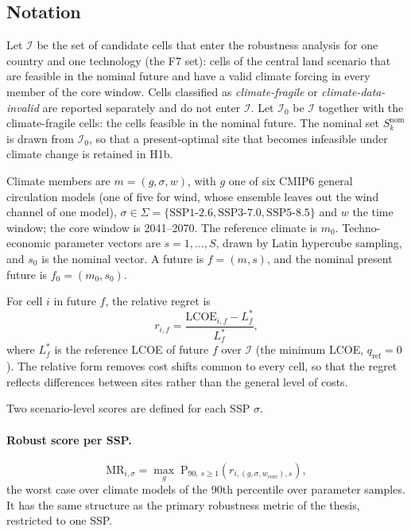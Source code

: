 \subsection{Notation}
\label{subsec:h1_notation}

Let $\mathcal{I}$ be the set of candidate cells that enter the robustness
analysis for one country and one technology (the F7 set): cells of the central
land scenario that are feasible in the nominal future and have a valid climate
forcing in every member of the core window. Cells classified as
\textit{climate-fragile} or \textit{climate-data-invalid} are reported
separately and do not enter $\mathcal{I}$.
Let $\mathcal{I}_0$ be $\mathcal{I}$ together with the climate-fragile cells: the
cells feasible in the nominal future. The nominal set $S^{\mathrm{nom}}_{k}$ is
drawn from $\mathcal{I}_0$, so that a present-optimal site that becomes
infeasible under climate change is retained in H1b.

Climate members are $m=(g,\sigma,w)$, with $g$ one of six CMIP6 general
circulation models (one of five for wind, whose ensemble leaves out the wind
channel of one model), $\sigma\in\Sigma=\{\mathrm{SSP1\text{-}2.6},
\mathrm{SSP3\text{-}7.0},\mathrm{SSP5\text{-}8.5}\}$ and $w$ the time window;
the core window is 2041--2070. The reference climate is $m_0$. Techno-economic
parameter vectors are $s=1,\dots,S$, drawn by Latin hypercube sampling, and
$s_0$ is the nominal vector. A future is $f=(m,s)$, and the nominal present
future is $f_0=(m_0,s_0)$.

For cell $i$ in future $f$, the relative regret is
\begin{equation}
    r_{i,f}=\frac{\mathrm{LCOE}_{i,f}-L^{*}_{f}}{L^{*}_{f}},
    \label{eq:h1_relative_regret}
\end{equation}
where $L^{*}_{f}$ is the reference LCOE of future $f$ over $\mathcal{I}$
(the minimum LCOE, $q_{\mathrm{ref}} = 0$). The
relative form removes cost shifts common to every cell, so that the regret
reflects differences between sites rather than the general level of costs.

Two scenario-level scores are defined for each SSP $\sigma$.

\paragraph{Robust score per SSP.}
\begin{equation}
    \mathrm{MR}_{i,\sigma}
    =\max_{g}\;
    \mathrm{P}_{90,\,s\geq 1}\!\left(r_{i,(g,\sigma,w_{\mathrm{core}}),s}\right),
    \label{eq:h1_mr_ssp}
\end{equation}
the worst case over climate models of the 90th percentile over parameter
samples. It has the same structure as the primary robustness metric of the
thesis, restricted to one SSP.

